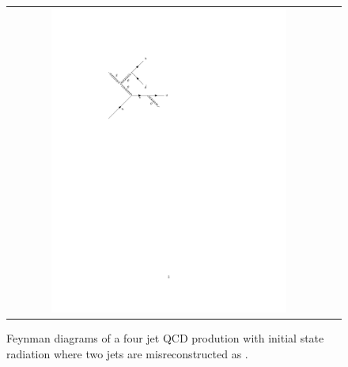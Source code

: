 \begin{figure}[tbh!]
	\centering
	\begin{tabular}{cc}
		\includegraphics[width=0.75\textwidth]{diagrams/pics/background_QCDinitrad.pdf}
	\end{tabular}
	\caption{Feynman diagrams of a four jet QCD prodution with initial state radiation where two jets are misreconstructed as \hadtau. }
	\label{fig:background_QCDinitrad}
\end{figure}

